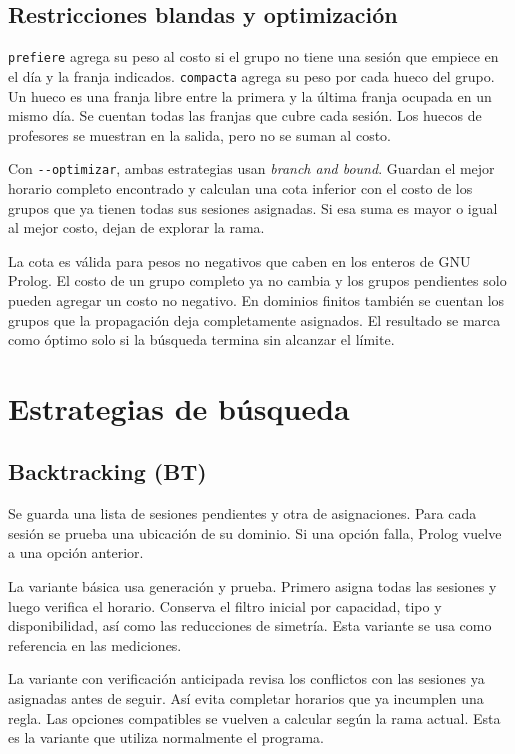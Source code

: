 \documentclass[11pt]{article}
\begin{document}
\subsection{Restricciones blandas y optimización}

\texttt{prefiere} agrega su peso al costo si el grupo no tiene una sesión que empiece en el día y la franja indicados. \texttt{compacta} agrega su peso por cada hueco del grupo. Un hueco es una franja libre entre la primera y la última franja ocupada en un mismo día. Se cuentan todas las franjas que cubre cada sesión. Los huecos de profesores se muestran en la salida, pero no se suman al costo.

Con \texttt{-{}-optimizar}, ambas estrategias usan \emph{branch and bound}. Guardan el mejor horario completo encontrado y calculan una cota inferior con el costo de los grupos que ya tienen todas sus sesiones asignadas. Si esa suma es mayor o igual al mejor costo, dejan de explorar la rama.

La cota es válida para pesos no negativos que caben en los enteros de GNU Prolog. El costo de un grupo completo ya no cambia y los grupos pendientes solo pueden agregar un costo no negativo. En dominios finitos también se cuentan los grupos que la propagación deja completamente asignados. El resultado se marca como óptimo solo si la búsqueda termina sin alcanzar el límite.

\section{Estrategias de búsqueda}

\subsection{Backtracking (BT)}

Se guarda una lista de sesiones pendientes y otra de asignaciones. Para cada sesión se prueba una ubicación de su dominio. Si una opción falla, Prolog vuelve a una opción anterior.

La variante básica usa generación y prueba. Primero asigna todas las sesiones y luego verifica el horario. Conserva el filtro inicial por capacidad, tipo y disponibilidad, así como las reducciones de simetría. Esta variante se usa como referencia en las mediciones.

La variante con verificación anticipada revisa los conflictos con las sesiones ya asignadas antes de seguir. Así evita completar horarios que ya incumplen una regla. Las opciones compatibles se vuelven a calcular según la rama actual. Esta es la variante que utiliza normalmente el programa.
\end{document}
